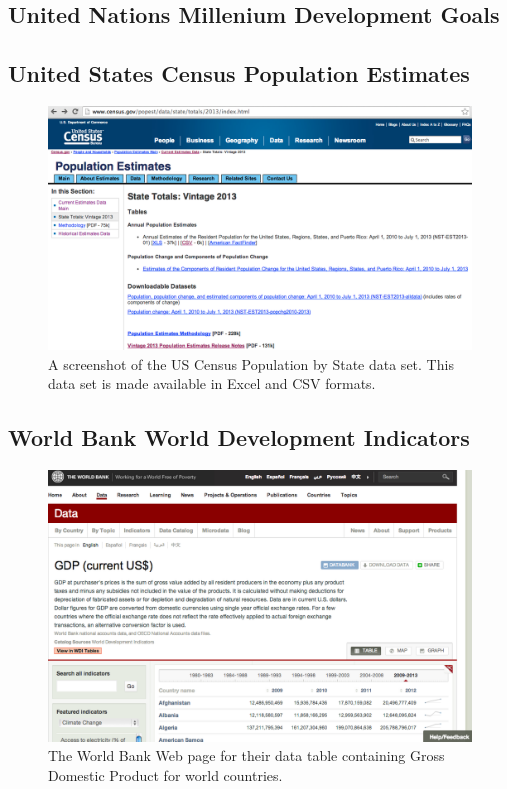 \subsection{United Nations Millenium Development Goals}
\subsection{United States Census Population Estimates}
\begin{figure}[h]
  \caption{A screenshot of the US Census Population by State data set. This data set is made available in Excel and CSV formats.}
  \centering
  \includegraphics[width=\textwidth]{figures/usCensusPopulationByState.png}
\end{figure}

\subsection{World Bank World Development Indicators}
\begin{figure}[h]
  \caption{The World Bank Web page for their data table containing Gross Domestic Product for world countries.}
  \centering
  \includegraphics[width=\textwidth]{figures/worldBankGDP.png}
\end{figure}

